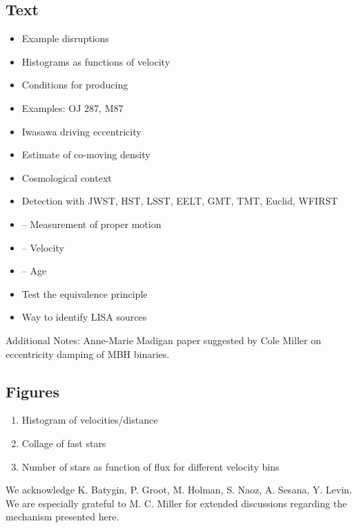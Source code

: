 \documentclass[a4paper,twocolumn]{emulateapj}
\begin{document}
\subsection{Text}

\begin{itemize}
\item Example disruptions
\item Histograms as functions of velocity
\item Conditions for producing
\item Examples: OJ 287, M87
\item Iwasawa driving eccentricity
\item Estimate of co-moving density
\item Cosmological context
\item Detection with JWST, HST, LSST, EELT, GMT, TMT, Euclid, WFIRST
\item -- Measurement of proper motion
\item -- Velocity
\item -- Age
\item Test the equivalence principle
\item Way to identify LISA sources
\end{itemize}

Additional Notes: Anne-Marie Madigan paper suggested by Cole Miller on eccentricity damping of MBH binaries.

\subsection{Figures}
\begin{enumerate}
\item Histogram of velocities/distance
\item Collage of fast stars
\item Number of stars as function of flux for different velocity bins
\end{enumerate}

\acknowledgements
We acknowledge K. Batygin, P. Groot, M. Holman, S. Naoz, A. Sesana, Y. Levin. We are especially grateful to M. C. Miller for extended discussions regarding the mechanism presented here.



\end{document}

